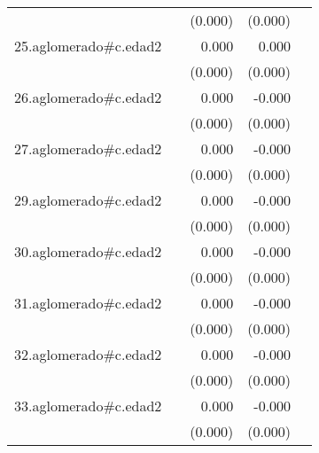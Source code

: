 {\begin{longtable}{l*{4}{D{.}{.}{-1}}}
            &                     &     (0.000)         &     (0.000)         &                     \\
\addlinespace
25.aglomerado#c.edad2&                     &       0.000\sym{***}&       0.000\sym{*}  &                     \\
            &                     &     (0.000)         &     (0.000)         &                     \\
\addlinespace
26.aglomerado#c.edad2&                     &       0.000         &      -0.000\sym{*}  &                     \\
            &                     &     (0.000)         &     (0.000)         &                     \\
\addlinespace
27.aglomerado#c.edad2&                     &       0.000         &      -0.000         &                     \\
            &                     &     (0.000)         &     (0.000)         &                     \\
\addlinespace
29.aglomerado#c.edad2&                     &       0.000         &      -0.000         &                     \\
            &                     &     (0.000)         &     (0.000)         &                     \\
\addlinespace
30.aglomerado#c.edad2&                     &       0.000         &      -0.000         &                     \\
            &                     &     (0.000)         &     (0.000)         &                     \\
\addlinespace
31.aglomerado#c.edad2&                     &       0.000         &      -0.000\sym{**} &                     \\
            &                     &     (0.000)         &     (0.000)         &                     \\
\addlinespace
32.aglomerado#c.edad2&                     &       0.000\sym{*}  &      -0.000         &                     \\
            &                     &     (0.000)         &     (0.000)         &                     \\
\addlinespace
33.aglomerado#c.edad2&                     &       0.000\sym{**} &      -0.000         &                     \\
            &                     &     (0.000)         &     (0.000)         &                     \\

\end{longtable}}

